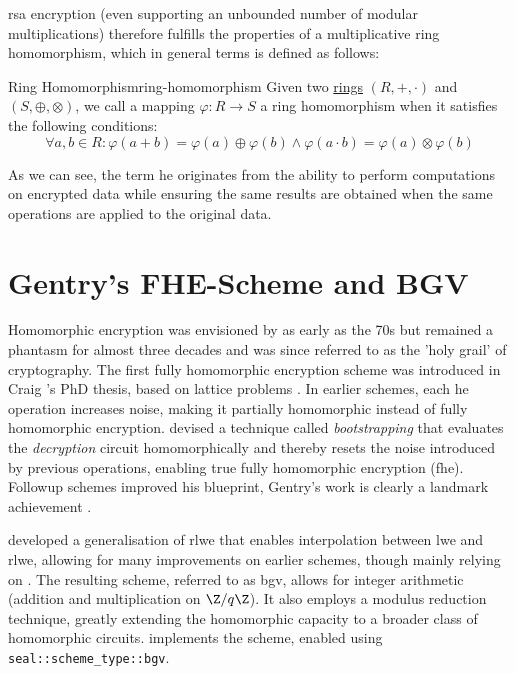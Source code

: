 \gls{rsa} encryption (even supporting an unbounded number of modular multiplications) therefore fulfills the properties of a multiplicative ring homomorphism, which in general terms is defined as follows:

\begin{definition}{Ring Homomorphism}{ring-homomorphism}
  Given two \hyperref[def:ring]{rings} $(R, +, \cdot)$ and $(S, \oplus, \otimes)$, we call a mapping $\varphi: R \rightarrow S$ a ring homomorphism when it satisfies the following conditions:
  $$\forall a, b \in R: \varphi(a + b) = \varphi(a) \oplus \varphi(b) \wedge \varphi(a \cdot b) = \varphi(a) \otimes \varphi(b)$$
\end{definition}

As we can see, the term \glsdesc{he} originates from the ability to perform computations on encrypted data while ensuring the same results are obtained when the same operations are applied to the original data.

\section{Gentry's FHE-Scheme and BGV}
Homomorphic encryption was envisioned by \citeauthor{1978-he-envisioned} as early as the 70s but remained a phantasm for almost three decades and was since referred to as the 'holy grail' of cryptography.
The first fully homomorphic encryption scheme was introduced in Craig 's PhD thesis, based on lattice problems \parencite{2009-gentry-fhe-original}.
In earlier schemes, each \gls{he} operation increases noise, making it partially homomorphic instead of fully homomorphic encryption.
 devised a technique called \textit{bootstrapping} that evaluates the \textit{decryption} circuit homomorphically and thereby resets the noise introduced by previous operations, enabling true fully homomorphic encryption (\gls{fhe}).
Followup schemes improved his blueprint, Gentry's work is clearly a landmark achievement \parencite{2010-first-glimpse-of-fhe}.

\cite{2012-bgv-original} developed a generalisation of \gls{rlwe} that enables interpolation between \gls{lwe} and \gls{rlwe}, allowing for many improvements on earlier schemes, though mainly relying on \cite{2009-gentry-fhe-original}.
The resulting scheme, referred to as \gls{bgv}, allows for integer arithmetic (addition and multiplication on $\Z/q\Z$). It also employs a modulus reduction technique, greatly extending the homomorphic capacity to a broader class of homomorphic circuits.
\cite{seal-4.0} implements the scheme, enabled using \texttt{seal::scheme\_type::bgv}.

